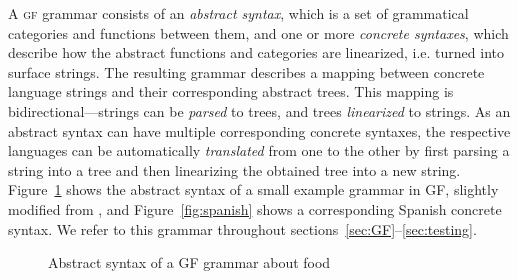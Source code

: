 \documentclass[11pt]{article}
\def\gf{\textsc{gf}}
\begin{document}
A \gf{} grammar consists of an \emph{abstract syntax}, which is a set
of grammatical categories and functions between them, and one or more
\emph{concrete syntaxes}, which describe how the abstract functions
and categories are linearized, i.e. turned into surface strings. The
resulting grammar describes a mapping between concrete language
strings and their corresponding abstract trees. This mapping is
bidirectional---strings can be \emph{parsed} to trees, and trees
\emph{linearized} to strings. As an abstract syntax can have multiple
corresponding concrete syntaxes, the respective languages can be
automatically \emph{translated} from one to the other by first parsing
a string into a tree and then linearizing the obtained tree into a new
string. 
Figure~\ref{fig:exampleGrammar} shows the abstract syntax of a small
example grammar in GF, slightly modified from
\cite{ranta2011gfbook}, and Figure~\ref{fig:spanish} shows a corresponding Spanish concrete
syntax. We refer to this grammar throughout sections~\ref{sec:GF}--\ref{sec:testing}. 


\begin{figure}[h]
\centering

\begin{Shaded}
\begin{Highlighting}[]
 \FunctionTok{=} \NormalTok{\{}
  \FunctionTok{=}  \NormalTok{;}
     \NormalTok{; } \NormalTok{; } \NormalTok{; } \NormalTok{;}
    \OtherTok{ :}  \OtherTok{->}  \OtherTok{->}  \NormalTok{;                          }
    \NormalTok{, }\NormalTok{, }\NormalTok{, }\OtherTok{ :}  \OtherTok{->}  \NormalTok{;           }
    \OtherTok{ :}  \OtherTok{->}  \OtherTok{->}  \NormalTok{;                          }
    \NormalTok{, }\NormalTok{, }\NormalTok{, }\OtherTok{ :}  \NormalTok{;}
    \NormalTok{, }\NormalTok{, }\NormalTok{, }\OtherTok{ :}  \NormalTok{;}
\end{Highlighting}
\end{Shaded}
  \caption{Abstract syntax of a GF grammar about food}
\label{fig:exampleGrammar}
\end{figure}
\end{document}

